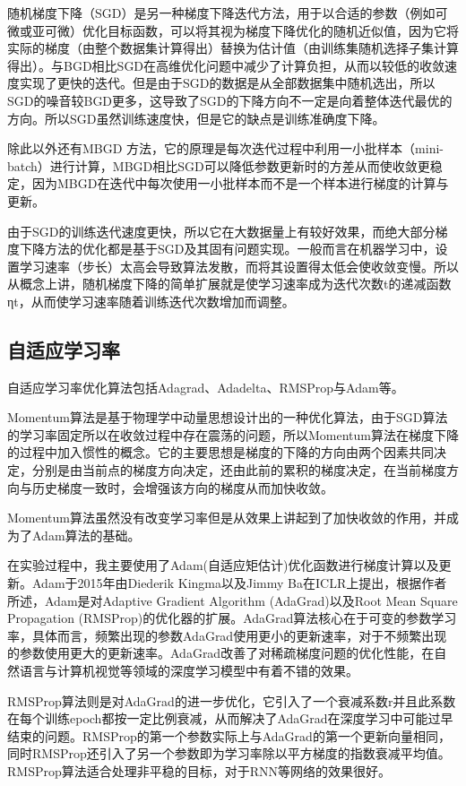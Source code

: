 随机梯度下降（SGD）是另一种梯度下降迭代方法，用于以合适的参数（例如可微或亚可微）优化目标函数，可以将其视为梯度下降优化的随机近似值，因为它将实际的梯度（由整个数据集计算得出）替换为估计值（由训练集随机选择子集计算得出）。与BGD相比SGD在高维优化问题中减少了计算负担，从而以较低的收敛速度实现了更快的迭代。但是由于SGD的数据是从全部数据集中随机选出，所以SGD的噪音较BGD更多，这导致了SGD的下降方向不一定是向着整体迭代最优的方向。所以SGD虽然训练速度快，但是它的缺点是训练准确度下降。

除此以外还有MBGD 方法，它的原理是每次迭代过程中利用一小批样本（mini-batch）进行计算，MBGD相比SGD可以降低参数更新时的方差从而使收敛更稳定，因为MBGD在迭代中每次使用一小批样本而不是一个样本进行梯度的计算与更新。

由于SGD的训练迭代速度更快，所以它在大数据量上有较好效果，而绝大部分梯度下降方法的优化都是基于SGD及其固有问题实现。一般而言在机器学习中，设置学习速率（步长）太高会导致算法发散，而将其设置得太低会使收敛变慢。所以从概念上讲，随机梯度下降的简单扩展就是使学习速率成为迭代次数t的递减函数ηt，从而使学习速率随着训练迭代次数增加而调整。

\subsection{自适应学习率}

自适应学习率优化算法包括Adagrad、Adadelta、RMSProp与Adam等。

Momentum算法是基于物理学中动量思想设计出的一种优化算法，由于SGD算法的学习率固定所以在收敛过程中存在震荡的问题，所以Momentum算法在梯度下降的过程中加入惯性的概念。它的主要思想是梯度的下降的方向由两个因素共同决定，分别是由当前点的梯度方向决定，还由此前的累积的梯度决定，在当前梯度方向与历史梯度一致时，会增强该方向的梯度从而加快收敛。

Momentum算法虽然没有改变学习率但是从效果上讲起到了加快收敛的作用，并成为了Adam算法的基础。

在实验过程中，我主要使用了Adam(自适应矩估计)优化函数进行梯度计算以及更新。Adam\cite{kingma2014adam}于2015年由Diederik Kingma以及Jimmy Ba在ICLR上提出，根据作者所述，Adam是对Adaptive Gradient Algorithm (AdaGrad)以及Root Mean Square Propagation (RMSProp)的优化器的扩展。AdaGrad算法核心在于可变的参数学习率，具体而言，频繁出现的参数AdaGrad使用更小的更新速率，对于不频繁出现的参数使用更大的更新速率。AdaGrad改善了对稀疏梯度问题的优化性能，在自然语言与计算机视觉等领域的深度学习模型中有着不错的效果。

RMSProp算法则是对AdaGrad的进一步优化，它引入了一个衰减系数r并且此系数在每个训练epoch都按一定比例衰减，从而解决了AdaGrad在深度学习中可能过早结束的问题。RMSProp的第一个参数实际上与AdaGrad的第一个更新向量相同，同时RMSProp还引入了另一个参数即为学习率除以平方梯度的指数衰减平均值。RMSProp算法适合处理非平稳的目标，对于RNN等网络的效果很好。

